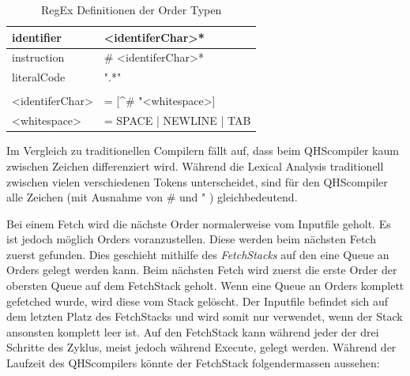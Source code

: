 \begin{table}[h]
    \centering
    \caption{RegEx Definitionen der Order Typen}
    \vspace{3mm} %
    
    \begin{tabular}{ll}
    \multicolumn{1}{l|}{identifier}        & \textless{}identiferChar\textgreater{}*                           \\ \hline
    \multicolumn{1}{l|}{instruction}       & \# \textless{}identiferChar\textgreater{}*                        \\ \hline
    \multicolumn{1}{l|}{literalCode}       & ".*"                                                              \\
                                           &                                                                   \\
    \textless{}identiferChar\textgreater{} & = {[}\textasciicircum{}\# "\textless{}whitespace\textgreater{}{]} \\
    \textless{}whitespace\textgreater{}    & = SPACE | NEWLINE | TAB
    
    \end{tabular}
\end{table}

Im Vergleich zu traditionellen Compilern fällt auf, dass beim QHScompiler kaum zwischen Zeichen differenziert wird. Während die Lexical Analysis traditionell zwischen vielen verschiedenen Tokens unterscheidet,
sind für den QHScompiler alle Zeichen (mit Ausnahme von \# und " ) gleichbedeutend.

Bei einem Fetch wird die nächste Order normalerweise vom Inputfile geholt.
Es ist jedoch möglich Orders voranzustellen. Diese werden beim nächsten Fetch zuerst gefunden. Dies geschieht mithilfe des \textit{FetchStacks} auf den eine Queue an Orders gelegt werden kann.
Beim nächsten Fetch wird zuerst die erste Order der obersten Queue auf dem FetchStack geholt. Wenn eine Queue an Orders komplett gefetched wurde, wird diese vom Stack gelöscht.
Der Inputfile befindet sich auf dem letzten Platz des FetchStacks und wird somit nur verwendet, wenn der Stack ansonsten komplett leer ist.
Auf den FetchStack kann während jeder der drei Schritte des Zyklus, meist jedoch während Execute, gelegt werden.
Während der Laufzeit des QHScompilers könnte der FetchStack folgendermassen aussehen:

